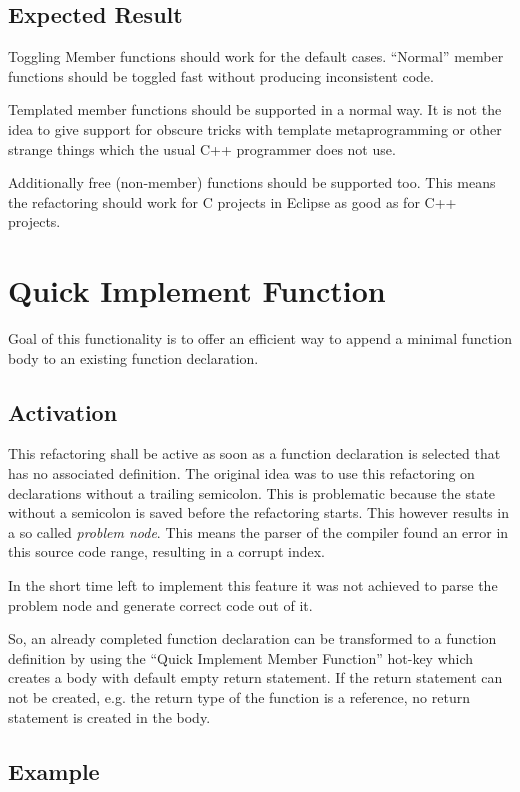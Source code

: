 \subsection{Expected Result}

Toggling Member functions should work for the default cases. ``Normal'' member
functions should be toggled fast without producing inconsistent code. 

Templated member functions should be supported in a normal way. It is not the
idea to give support for obscure tricks with template metaprogramming or other
strange things which the usual C++ programmer does not use. 

Additionally free (non-member) functions should be supported too. This means the
refactoring should work for C projects in Eclipse as good as for C++ projects.

\section{Quick Implement Function}

Goal of this functionality is to offer an efficient way to append a minimal
function body to an existing function declaration.

\subsection{Activation}
This refactoring shall be active as soon as a function declaration is selected 
that has no associated definition. The original idea was to use this
refactoring on declarations without a trailing semicolon. This is problematic
because the state without a semicolon is saved before the refactoring starts.
This however results in a so called \textit{problem node}. This means the
parser of the compiler found an error in this source code range, resulting in 
a corrupt index.

In the short time left to implement this feature it was not achieved to
parse the problem node and generate correct code out of it.

So, an already completed function declaration can be transformed to a function
definition by using the ``Quick Implement Member Function'' hot-key which
creates a body with default empty return statement. If the return statement can
not be created, e.g. the return type of the function is a reference, no return
statement is created in the body.

\subsection*{Example}

